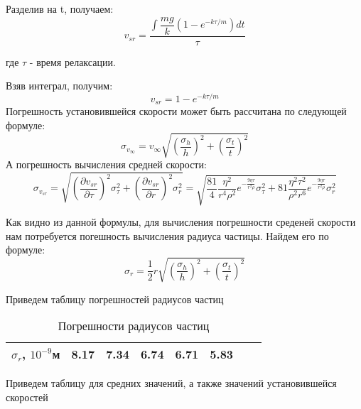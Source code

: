 \documentclass[a4paper,12pt]{article}
\begin{document}
\par Разделив на t, получаем:
\begin{equation}
v_{sr} = \frac{\int\dfrac{mg}{k}\left(1 - e^{-k\tau/m}\right)dt}{\tau}
\end{equation}
\par где $\tau$ - время релаксации.
\par Взяв интеграл, получим:
\begin{equation}
v_{sr} = 1 - e^{-k\tau/m}
\end{equation}
Погрешность установившейся скорости может быть рассчитана по следующей формуле:
\begin{equation}
\sigma_{v_{\infty}} = v_{\infty}\sqrt{(\frac{\sigma_{h}}{h})^{2} + (\frac{\sigma_{t}}{t})^{2}}
\end{equation}
А погрешность вычисления средней скорости:
\begin{equation}
\sigma_{v_{sr}} = \sqrt{(\frac{\partial v_{sr}}{\partial \tau})^{2} \sigma_{\tau}^{2} + (\frac{\partial v_{sr}}{\partial r})^{2} \sigma_{r}^{2}} = \sqrt{\frac{81}{4}\frac{\eta^{2}}{r^{4}\rho^{2}}e^{-\frac{9\eta\tau}{r^{2}\rho}}\sigma_{\tau}^{2} + 81\frac{\eta^{2}\tau^{2}}{\rho^{2}r^{6}}e^{-\frac{9\eta\tau}{r^{2}\rho}}\sigma_r^{2}}
\end{equation}
\par Как видно из данной формулы, для вычисления погрешности среденей скорости нам потребуется погешность вычисления радиуса частицы. Найдем его по формуле:
\begin{equation}
\sigma_{r} = \frac{1}{2}r\sqrt{(\frac{\sigma_{h}}{h})^{2} + (\frac{\sigma_{t}}{t})^{2}}
\end{equation}
\par Приведем таблицу погрешностей радиусов частиц
\begin{table}[h]
    \centering
    \begin{center}
    \caption{Погрешности радиусов частиц}
    \end{center}
    \vspace{0.1cm}
    \label{tab:my_label}
    \begin{tabular}{ |p{2.7cm}||p{2.7cm}|p{2.7cm}|p{2.7cm}|p{2.7cm}|p{2.7cm}|p{2.7cm}|p{2.7cm}| }
 \hline
    $\sigma_{r}$, $10^{-9}$м & 8.17 & 7.34 & 6.74 & 6.71 &5.83\\
 \hline
    \end{tabular}
\end{table}
\par Приведем таблицу для средних значений, а также значений установившейся скоростей
\end{document}
